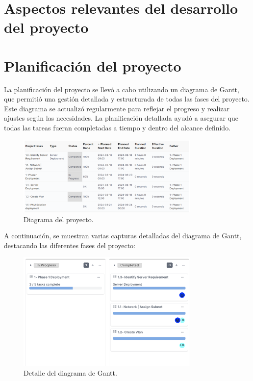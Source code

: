 
\section{Aspectos relevantes del desarrollo del proyecto}

\section{Planificación del proyecto}
La planificación del proyecto se llevó a cabo utilizando un diagrama de Gantt, que permitió una gestión detallada y estructurada de todas las fases del proyecto. Este diagrama se actualizó regularmente para reflejar el progreso y realizar ajustes según las necesidades. La planificación detallada ayudó a asegurar que todas las tareas fueran completadas a tiempo y dentro del alcance definido.

\begin{figure}[H]
	\centering
	\includegraphics[width=0.8\textwidth]{./img/diagrama1.png}
	\caption{Diagrama del proyecto.}
	\label{fig:diagrama1}
\end{figure}
A continuación, se muestran varias capturas detalladas del diagrama de Gantt, destacando las diferentes fases del proyecto:

\begin{figure}[H]
	\centering
	\includegraphics[width=0.8\textwidth]{./img/diagrama2.png}
	\caption{Detalle del diagrama de Gantt.}
	\label{fig:diagrama_detalle1}
\end{figure}

